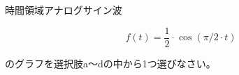 時間領域アナログサイン波

\[
f(t) = \frac{1}{2} \cdot \cos( \pi/2 \cdot t )
\]

\bigskip
\noindent  のグラフを選択肢a〜dの中から1つ選びなさい。
